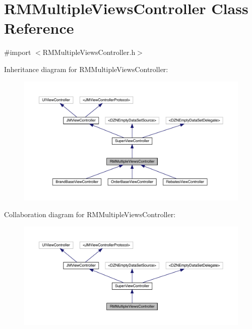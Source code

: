 \hypertarget{interface_r_m_multiple_views_controller}{}\section{R\+M\+Multiple\+Views\+Controller Class Reference}
\label{interface_r_m_multiple_views_controller}


{\ttfamily \#import $<$R\+M\+Multiple\+Views\+Controller.\+h$>$}



Inheritance diagram for R\+M\+Multiple\+Views\+Controller\+:\nopagebreak
\begin{figure}[H]
\begin{center}
\leavevmode
\includegraphics[width=350pt]{interface_r_m_multiple_views_controller__inherit__graph}
\end{center}
\end{figure}


Collaboration diagram for R\+M\+Multiple\+Views\+Controller\+:\nopagebreak
\begin{figure}[H]
\begin{center}
\leavevmode
\includegraphics[width=350pt]{interface_r_m_multiple_views_controller__coll__graph}
\end{center}
\end{figure}
